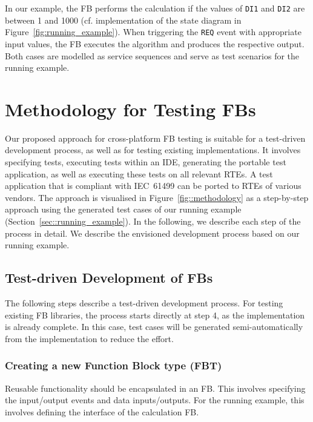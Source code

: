 \begin{bibunit}
In our example, the FB performs the calculation if the values of \texttt{DI1} and \texttt{DI2} are between 1 and 1000 (cf. implementation of the state diagram in Figure~\ref{fig:running_example}). When triggering the \texttt{REQ} event with appropriate input values, the FB executes the algorithm and produces the respective output. Both cases are modelled as service sequences and serve as test scenarios for the running example.

\section{Methodology for Testing FBs}
\label{sec::methodology}
Our proposed approach for cross-platform FB testing is suitable for a test-driven development process, as well as for testing existing implementations. It involves specifying tests, executing tests within an IDE, generating the portable test application, as well as executing these tests on all relevant RTEs. A test application that is compliant with IEC~61499 can be ported to RTEs of various vendors. The approach is visualised in Figure~\ref{fig::methodology} as a step-by-step approach using the generated test cases of our running example (Section~\ref{sec::running_example}). In the following, we describe each step of the process in detail. We describe the envisioned development process based on our running example.

\subsection{Test-driven Development of FBs}
The following steps describe a test-driven development process. For testing existing FB libraries, the process starts directly at step 4, as the implementation is already complete. In this case, test cases will be generated semi-automatically from the implementation to reduce the effort.

\subsubsection{Creating a new Function Block type (FBT)}
Reusable functionality should be encapsulated in an FB. This involves specifying the input/output events and data inputs/outputs. For the running example, this involves defining the interface of the calculation FB.


\end{bibunit}
